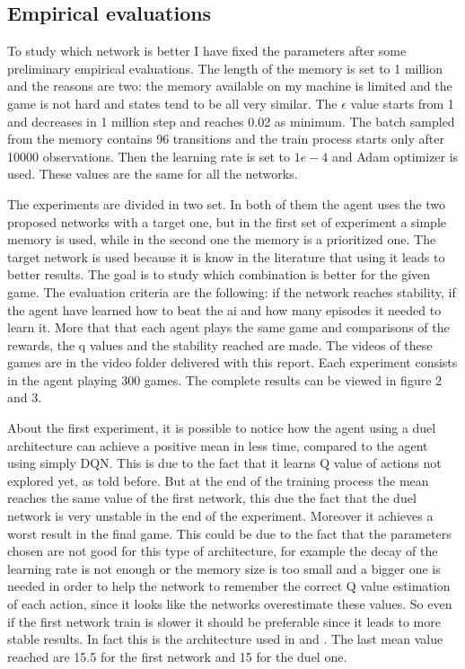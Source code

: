 \documentclass[10pt]{article}
\begin{document}
\begin{multicols}{2}
\section{Empirical evaluations}
To study which network is better I have fixed the parameters after some preliminary empirical evaluations. The length of the memory is set to 1 million and the reasons are two: the memory available on my machine is limited and the game is not hard and states tend to be all very similar. The $\epsilon$ value starts from 1 and decreases in 1 million step and reaches 0.02 as minimum. The batch sampled from the memory contains 96 transitions and the train process starts only after 10000 observations. Then the learning rate is set to $1e-4$ and Adam optimizer is used. These values are the same for all the networks. 

The experiments are divided in two set. In both of them the agent uses the two proposed networks with a target one, but in the first set of experiment a simple memory is used, while in the second one the memory is a prioritized one. The target network is used because it is know in the literature that using it leads to better results. The goal is to study which combination is better for the given game. The evaluation criteria are the following: if the network reaches stability, if the agent have learned how to beat the ai and how many episodes it needed to learn it. More that that each agent plays the same game and comparisons of the rewards, the q values and the stability reached are made. The videos of these games are in the video folder delivered with this report. Each experiment consists in the agent playing 300 games. The complete results can be viewed in figure 2 and 3.

About the first experiment, it is possible to notice how the agent using a duel architecture can achieve a positive mean in less time, compared to the agent using simply DQN. This is due to the fact that it learns Q value of actions not explored yet, as told before. But at the end of the training process the mean reaches the same value of the first network, this due the fact that the duel network is very unstable in the end of the experiment. Moreover it achieves a worst result in the final game. This could be due to the fact that the parameters chosen are not good for this type of architecture, for example the decay of the learning rate is not enough or the memory size is too small and a bigger one is needed in order to help the network to remember the correct Q value estimation of each action, since it looks like the networks overestimate these values. So even if the first network train is slower it should be preferable since it leads to more stable results. In fact this is the architecture used in \cite{playAtariGame} and \cite{playAtariGameHuman}. The last mean value reached are 15.5 for the first network and 15 for the duel one.


\end{multicols}
\end{document}
